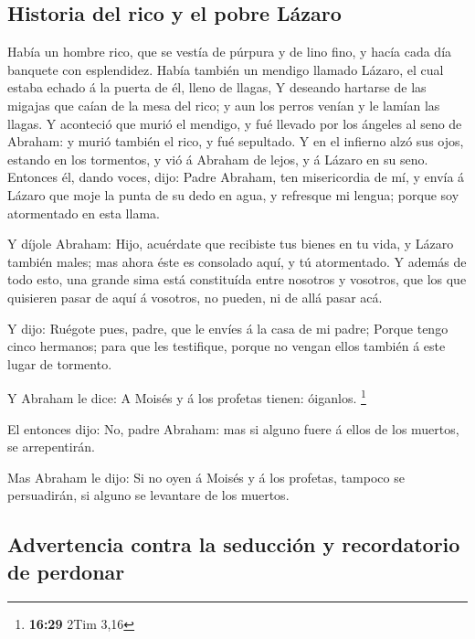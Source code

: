\hypertarget{historia-del-rico-y-el-pobre-luxe1zaro}{%
\subsection{Historia del rico y el pobre
Lázaro}\label{historia-del-rico-y-el-pobre-luxe1zaro}}

 Había un hombre rico, que se vestía de púrpura y de lino
fino, y hacía cada día banquete con esplendidez.  Había
también un mendigo llamado Lázaro, el cual estaba echado á la puerta de
él, lleno de llagas,  Y deseando hartarse de las migajas
que caían de la mesa del rico; y aun los perros venían y le lamían las
llagas.  Y aconteció que murió el mendigo, y fué llevado
por los ángeles al seno de Abraham: y murió también el rico, y fué
sepultado.  Y en el infierno alzó sus ojos, estando en los
tormentos, y vió á Abraham de lejos, y á Lázaro en su seno.
 Entonces él, dando voces, dijo: Padre Abraham, ten
misericordia de mí, y envía á Lázaro que moje la punta de su dedo en
agua, y refresque mi lengua; porque soy atormentado en esta llama.

 Y díjole Abraham: Hijo, acuérdate que recibiste tus bienes
en tu vida, y Lázaro también males; mas ahora éste es consolado aquí, y
tú atormentado.  Y además de todo esto, una grande sima
está constituída entre nosotros y vosotros, que los que quisieren pasar
de aquí á vosotros, no pueden, ni de allá pasar acá.

 Y dijo: Ruégote pues, padre, que le envíes á la casa de mi
padre;  Porque tengo cinco hermanos; para que les
testifique, porque no vengan ellos también á este lugar de tormento.

 Y Abraham le dice: A Moisés y á los profetas tienen:
óiganlos. \footnote{\textbf{16:29} 2Tim 3,16}

 El entonces dijo: No, padre Abraham: mas si alguno fuere á
ellos de los muertos, se arrepentirán.

 Mas Abraham le dijo: Si no oyen á Moisés y á los profetas,
tampoco se persuadirán, si alguno se levantare de los muertos.

\hypertarget{advertencia-contra-la-seducciuxf3n-y-recordatorio-de-perdonar}{%
\subsection{Advertencia contra la seducción y recordatorio de
perdonar}\label{advertencia-contra-la-seducciuxf3n-y-recordatorio-de-perdonar}}

